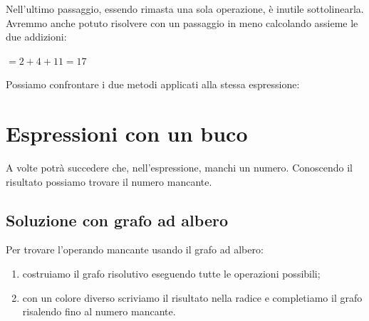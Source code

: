 Nell'ultimo passaggio, essendo rimasta una sola operazione, è inutile 
sottolinearla. Avremmo anche potuto risolvere con un passaggio in meno
calcolando assieme le due addizioni:

\(= 2 + 4 + 11 = 17\)

\begin{esempio}{}{}
Possiamo confrontare i due metodi applicati alla stessa espressione:

\vspace{2mm}
\end{esempio}


\section{Espressioni con un buco}
\label{sec:nat_espressioni_buco}

A volte potrà succedere che, nell'espressione, manchi un numero.
Conoscendo il risultato possiamo trovare il numero mancante.

\subsection{Soluzione con grafo ad albero}


\begin{procedura}{}{}
 Per trovare l'operando mancante usando il grafo ad albero:
\begin{enumerate} [noitemsep]
\item costruiamo il grafo risolutivo eseguendo tutte le operazioni 
possibili;
\item con un colore diverso scriviamo il risultato nella radice e 
completiamo il grafo risalendo fino al numero mancante.
\end{enumerate}
\end{procedura}

